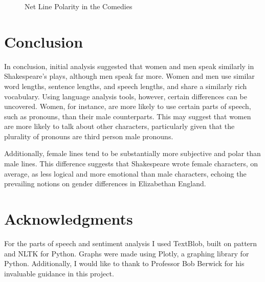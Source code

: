 \documentclass[12pt]{article} %
\begin{document}
\begin{figure}[H] %
\caption{Net Line Polarity in the Comedies}
\label{fig:speciation}
\end{figure}


\section{Conclusion} %

In conclusion, initial analysis suggested that women and men speak similarly in Shakespeare's plays, although men speak far more. Women and men use similar word lengths, sentence lengths, and speech lengths, and share a similarly rich vocabulary. Using language analysis tools, however, certain differences can be uncovered. Women, for instance, are more likely to use certain parts of speech, such as pronouns, than their male counterparts. This may suggest that women are more likely to talk about other characters, particularly given that the plurality of pronouns are third person male pronouns.

Additionally, female lines tend to be substantially more subjective and polar than male lines. This difference suggests that Shakespeare wrote female characters, on average, as less logical and more emotional than male characters, echoing the prevailing notions on gender differences in Elizabethan England.


\section{Acknowledgments} %

For the parts of speech and sentiment analysis I used TextBlob, built on pattern and NLTK for Python. Graphs were made using Plotly, a graphing library for Python. Additionally, I would like to thank to Professor Bob Berwick for his invaluable guidance in this project.

\end{document}
